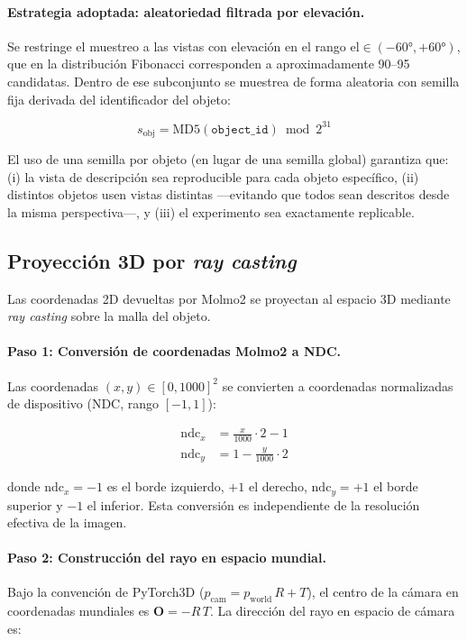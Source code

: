 \paragraph{Estrategia adoptada: aleatoriedad filtrada por elevación.}
Se restringe el muestreo a las vistas con elevación en el rango
$\text{el} \in (-60°, +60°)$, que en la distribución Fibonacci corresponden a
aproximadamente 90--95 candidatas. Dentro de ese subconjunto se muestrea de forma
aleatoria con semilla fija derivada del identificador del objeto:

\begin{equation}
    s_{\text{obj}} = \mathrm{MD5}(\texttt{object\_id}) \bmod 2^{31}
    \label{eq:seed}
\end{equation}

El uso de una semilla por objeto (en lugar de una semilla global) garantiza que:
(i) la vista de descripción sea reproducible para cada objeto específico, (ii)
distintos objetos usen vistas distintas —evitando que todos sean descritos desde
la misma perspectiva—, y (iii) el experimento sea exactamente replicable.

\newpage
\subsection{Proyección 3D por \textit{ray casting}}
\label{sec:raycasting}

Las coordenadas 2D devueltas por Molmo2 se proyectan al espacio 3D mediante
\textit{ray casting} sobre la malla del objeto.

\paragraph{Paso 1: Conversión de coordenadas Molmo2 a NDC.}
Las coordenadas $(x, y) \in [0, 1000]^2$ se convierten a coordenadas normalizadas
de dispositivo (NDC, rango $[-1,1]$):

\begin{align}
    \text{ndc}_x &= \frac{x}{1000}\cdot 2 - 1 \label{eq:ndc_x} \\[4pt]
    \text{ndc}_y &= 1 - \frac{y}{1000}\cdot 2 \label{eq:ndc_y}
\end{align}

donde $\text{ndc}_x = -1$ es el borde izquierdo, $+1$ el derecho,
$\text{ndc}_y = +1$ el borde superior y $-1$ el inferior. Esta conversión es
independiente de la resolución efectiva de la imagen.

\paragraph{Paso 2: Construcción del rayo en espacio mundial.}
Bajo la convención de PyTorch3D ($p_{\text{cam}} = p_{\text{world}}\,R + T$),
el centro de la cámara en coordenadas mundiales es $\mathbf{O} = -R\,T$.
La dirección del rayo en espacio de cámara es:

